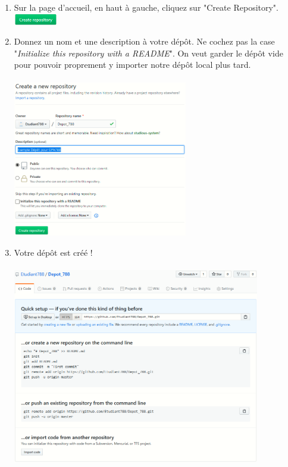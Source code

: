 \documentclass{article}
\begin{document}
\begin{enumerate}

  \item Sur la page d'accueil, en haut à gauche, cliquez sur "Create Repository".
  \includegraphics[width=0.15\textwidth, left]{Create_repo}
  
  \item Donnez un nom et une description à votre dépôt. Ne cochez pas la case "\textit{Initialize this repository with a README}". On veut garder le dépôt vide pour pouvoir proprement y importer notre dépôt local plus tard.\\\\
    \includegraphics[width=0.6\textwidth, center]{New_Repo}
  
  \pagebreak  
  \item Votre dépôt est créé !\\\\
  \includegraphics[width=0.85\textwidth, center]{Created_Repo}
  
\end{enumerate}
\end{document}
